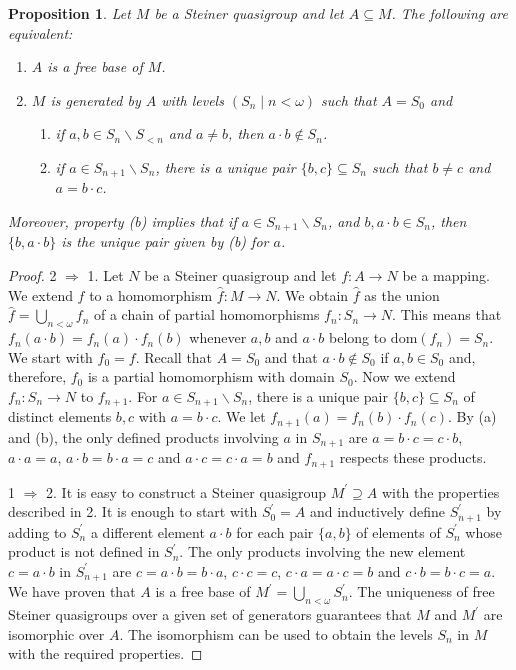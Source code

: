 \documentclass[10pt,a4paper]{article}
\theoremstyle{note}
\newtheorem{prop}[thm]{Proposition}
\begin{document}
	\begin{prop}\label{May12_2} Let $M$ be a Steiner quasigroup and let $A\subseteq M$. The following are equivalent:
		\begin{enumerate}
			\item $A$ is a free base of $M$.
			\item $M$ is generated by $A$ with  levels $(S_n\mid n<\omega)$ such that $A=S_0$ and
			\begin{enumerate}
				\item if $a,b\in S_n\smallsetminus S_{<n}$ and $a\neq b$, then $a\cdot b\not\in S_n$.
				\item if $a\in S_{n+1}\smallsetminus S_n$, there is a unique pair $\{b,c\}\subseteq S_n$ such that $b\neq c$ and $a= b\cdot c$.
			\end{enumerate}
		\end{enumerate}
		Moreover, property (b) implies that if  $a\in S_{n+1}\smallsetminus S_n$, and $b, a\cdot b\in S_n$, then  $\{b,a\cdot b\}$ is the unique pair given by (b) for  $a$.
	\end{prop}
	\begin{proof} 2 $\Rightarrow$ 1.  Let $N$ be a Steiner quasigroup and let $f:A\rightarrow N$ be a mapping. We extend $f$ to a homomorphism $\hat{f}: M\rightarrow N$.  We obtain $\hat{f}$ as the union $\hat{f}= \bigcup_{n<\omega}f_n$  of a chain  of partial homomorphisms $f_n : S_n \to N$. This means that  $f_n(a\cdot b)= f_n(a)\cdot f_n(b)$  whenever $a,b$ and $a\cdot b$  belong to $\mathrm{dom} (f_n)=S_n$. We start with $f_0=f$.  Recall that $A=S_0$ and that $a\cdot b\not\in S_0$  if $a,b\in S_0$ and, therefore, $f_0$ is a partial homomorphism with domain $S_0$. Now we extend  $f_n:S_n\rightarrow N$  to $f_{n+1}$. %
	For $a \in S_{n+1}\smallsetminus S_n$, there is a unique pair $\{b,c\}\subseteq S_n$ of distinct elements $b,c$ with $a=b\cdot c$. We let  $f_{n+1}(a) = f_n(b)\cdot f_n(c)$.  By (a) and (b), the only defined products involving $a$ in $S_{n+1}$ are   $a=b\cdot c=c\cdot b$, $a\cdot a=a$, $a\cdot b = b\cdot a= c$ and $a\cdot c= c\cdot a =b$ and $f_{n+1}$ respects these products.
		
		1 $\Rightarrow$ 2.  It is easy to construct a Steiner quasigroup $M^\prime\supseteq A $ with the properties described in 2. It is enough to start with $S^\prime_0=A$ and inductively define $S^\prime_{n+1}$ by adding to $S^\prime_n$ a different element $a\cdot b$ for each pair $\{a,b\}$ of elements of $S^\prime_n$ whose product is not defined in $S^\prime_n$. The only  products involving  the new element $c=a\cdot b$ in $S^\prime_{n+1}$ are $c=a\cdot b=b\cdot a$, $c\cdot c=c$, $c\cdot a= a\cdot c=b$ and $c\cdot b=b\cdot c= a$. We have proven that $A$ is a free base of $M^\prime= \bigcup_{n<\omega}S^\prime_n$. The uniqueness of free  Steiner quasigroups over a given set of generators guarantees that $M$ and $M^\prime$ are isomorphic over $A$.  The isomorphism can be used to obtain the levels $S_n$ in $M$ with the required properties.
	\end{proof}
\end{document}
